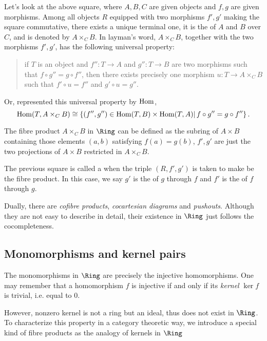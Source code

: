   Let's look at the above square, where $A,B,C$ are given objects and $f,g$ are given morphisms. Among all objects $R$ equipped with two morphisms $f',g'$ making the square commutative, there exists a unique terminal one, it is the  of $A$ and $B$ over $C$, and is denoted by $A\times_CB$. In layman's word, $A\times_CB$, together with the two morphisms $f',g'$, has the following universal property:
  \begin{quote}
    if $T$ is an object and $f''\colon T\to A$ and $g''\colon T\to B$ are two morphisms such that $f\circ g'' = g\circ f''$, then there exists precisely one morphism $u\colon T\to A\times_CB$ such that $f'\circ u = f''$ and $g'\circ u =g''$.
  \end{quote}
  Or, represented this universal property by $\operatorname{Hom}$,
  \begin{equation*}
    \operatorname{Hom}(T,A\times_CB) \cong \left\{ (f'',g'')\in\operatorname{Hom}(T,B)\times\operatorname{Hom}(T,A) \middle|\, f\circ g'' = g\circ f'' \right\}.
  \end{equation*}

  The fibre product $A\times_CB$ in $\Ring$ can be defined as the subring of $A\times B$ containing those elements $(a,b)$ satisfying $f(a)=g(b)$, $f',g'$ are just the two projections of $A\times B$ restricted in $A\times_CB$.
  \begin{rem}
    The previous square is called a  when the triple $(R,f',g')$ is taken to make be the fibre product. In this case, we say $g'$ is the  of $g$ through $f$ and $f'$ is the  of $f$ through $g$.
  \end{rem}

  Dually, there are \emph{cofibre products}, \emph{cocartesian diagrams} and \emph{pushouts}. Although they are not easy to describe in detail, their existence in $\Ring$ just follows the cocompleteness.


\subsection{Monomorphisms and kernel pairs}
  The monomorphisms in $\Ring$ are precisely the injective homomorphisms. One may remember that a homomorphism $f$ is injective if and only if its \emph{kernel} $\ker{f}$ is trivial, i.e. equal to $0$.

  However, nonzero kernel is not a ring but an ideal, thus does not exist in $\Ring$. To characterize this property in a category theoretic way, we introduce a special kind of fibre products as the analogy of kernels in $\Ring$

